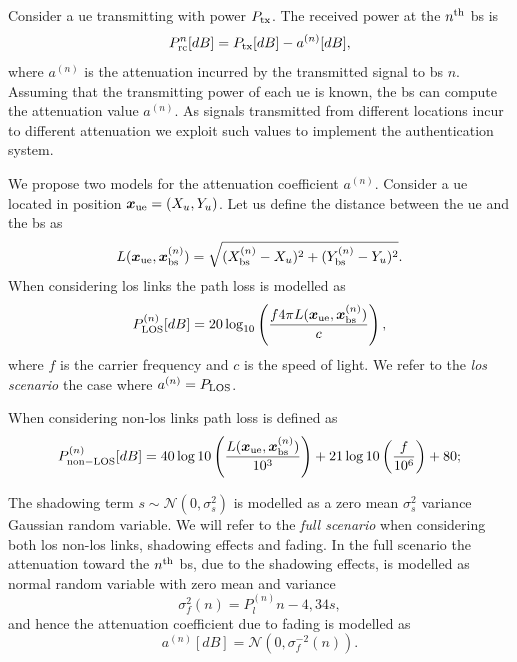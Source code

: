 \documentclass[draftcls,onecolumn,12pt]{IEEEtran}
\begin{document}
Consider a \ac{ue} transmitting with power $P_{\rm tx}$. The received power at the $n^{\rm th}$ \ac{bs} is
\begin{equation}
    P_{\rm rc}^n[dB]= P_{\rm tx}[dB] -  a^{(n)}[dB],
\end{equation}
where $a^{(n)}$ is the attenuation incurred by the transmitted signal to \ac{bs} $n$. Assuming that the transmitting power of each \ac{ue} is known, the \ac{bs} can compute the attenuation value $a^{(n)}$. As signals transmitted from different locations incur to different attenuation we exploit such values to implement the authentication system.

We propose two models for the attenuation coefficient $a^{(n)}$. Consider a \ac{ue} located in position $\bm{x}_{\rm ue}=(X_u,Y_u)$. Let us define the distance between the \ac{ue} and the \ac{bs} as
\begin{equation}
    L(\bm{x}_{\rm ue},\bm{x}_{\rm bs}^{(n)}) = \sqrt{(X_{\rm bs}^{(n)}-X_u)^2+(Y_{\rm bs}^{(n)}-Y_u)^2}.
\end{equation}
When considering \ac{los} links the path loss is modelled as
\begin{equation}\label{eq:los}
    P_{\rm LOS}^{(n)}[dB] = 20\log_{10}\left(\frac{f 4\pi L(\bm{x}_{\rm ue},\bm{x}_{\rm bs}^{(n)})}{c}\right),
\end{equation}
where $f$ is the carrier frequency and $c$ is the speed of light.
We refer to the \textit{\ac{los} scenario} the case where $a^{(n)}=P_{\rm LOS}$.

When considering non-\ac{los} links path loss is defined as
\begin{equation}
    P_{\rm non-LOS}^{(n)}[dB] = 40\log10\left (\frac{L(\bm{x}_{\rm ue},\bm{x}_{\rm bs}^{(n)})}{10^3}\right ) + 21\log10\left(\frac{f}{10^6}\right) + 80;
\end{equation}

The shadowing term $s \sim \mathcal{N}(0,\sigma_s^2)$ is modelled as a zero mean $\sigma_s^2$ variance Gaussian random variable. We will refer to the \textit{full scenario} when considering both \ac{los} non-\ac{los} links, shadowing effects and fading. In the full scenario the attenuation toward the $n^{\rm th}$ \ac{bs}, due to the shadowing effects, is modelled as normal random variable with zero mean and variance
\begin{equation}\label{eq:rss}
    \sigma_f^2(n) = P_l^{(n)}n-4,34s,
\end{equation}
and hence the attenuation coefficient due to fading is modelled as
\begin{equation}\label{eq:fade}
a^{(n)}[dB]= \mathcal{N}(0,\sigma_f^{-2}(n)).
\end{equation}
\end{document}
